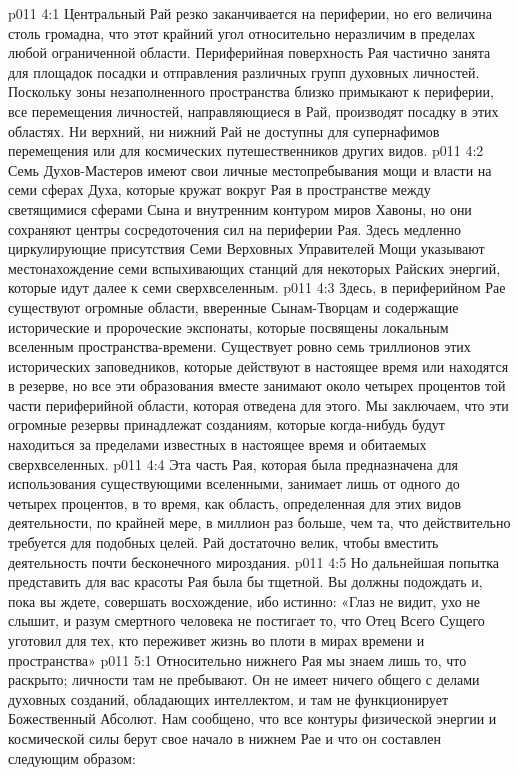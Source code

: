 \vs p011 4:1 Центральный Рай резко заканчивается на периферии, но его величина столь громадна, что этот крайний угол относительно неразличим в пределах любой ограниченной области. Периферийная поверхность Рая частично занята для площадок посадки и отправления различных групп духовных личностей. Поскольку зоны незаполненного пространства близко примыкают к периферии, все перемещения личностей, направляющиеся в Рай, производят посадку в этих областях. Ни верхний, ни нижний Рай не доступны для супернафимов перемещения или для космических путешественников других видов.
\vs p011 4:2 Семь Духов\hyp{}Мастеров имеют свои личные местопребывания мощи и власти на семи сферах Духа, которые кружат вокруг Рая в пространстве между светящимися сферами Сына и внутренним контуром миров Хавоны, но они сохраняют центры сосредоточения сил на периферии Рая. Здесь медленно циркулирующие присутствия Семи Верховных Управителей Мощи указывают местонахождение семи вспыхивающих станций для некоторых Райских энергий, которые идут далее к семи сверхвселенным.
\vs p011 4:3 Здесь, в периферийном Рае существуют огромные области, вверенные Сынам\hyp{}Творцам и содержащие исторические и пророческие экспонаты, которые посвящены локальным вселенным пространства\hyp{}времени. Существует ровно семь триллионов этих исторических заповедников, которые действуют в настоящее время или находятся в резерве, но все эти образования вместе занимают около четырех процентов той части периферийной области, которая отведена для этого. Мы заключаем, что эти огромные резервы принадлежат созданиям, которые когда\hyp{}нибудь будут находиться за пределами известных в настоящее время и обитаемых сверхвселенных.
\vs p011 4:4 Эта часть Рая, которая была предназначена для использования существующими вселенными, занимает лишь от одного до четырех процентов, в то время, как область, определенная для этих видов деятельности, по крайней мере, в миллион раз больше, чем та, что действительно требуется для подобных целей. Рай достаточно велик, чтобы вместить деятельность почти бесконечного мироздания.
\vs p011 4:5 Но дальнейшая попытка представить для вас красоты Рая была бы тщетной. Вы должны подождать и, пока вы ждете, совершать восхождение, ибо истинно: «Глаз не видит, ухо не слышит, и разум смертного человека не постигает то, что Отец Всего Сущего уготовил для тех, кто переживет жизнь во плоти в мирах времени и пространства»
\vs p011 5:1 Относительно нижнего Рая мы знаем лишь то, что раскрыто; личности там не пребывают. Он не имеет ничего общего с делами духовных созданий, обладающих интеллектом, и там не функционирует Божественный Абсолют. Нам сообщено, что все контуры физической энергии и космической силы берут свое начало в нижнем Рае и что он составлен следующим образом:
